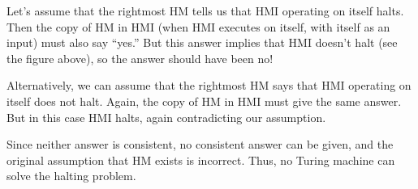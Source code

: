 \centerline{}

Let's assume that the rightmost HM tells us that HMI operating on itself halts.
Then the copy of HM in HMI (when HMI executes on itself, with itself
as an input) must also say ``yes.''  But this answer implies that HMI
doesn't halt (see the figure above), so the answer should have been
no!

Alternatively, we can assume that the rightmost HM says that HMI operating on itself
does not halt.  Again, the copy of HM in HMI must give the same
answer.  But in this case HMI halts, again contradicting our
assumption.

Since neither answer is consistent, no consistent answer can be given,
and the original assumption that HM exists is incorrect.  Thus, no
Turing machine can solve the halting problem.

\vfill

\pagebreak

